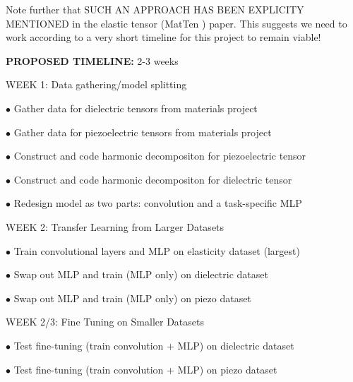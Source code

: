 \documentclass[10pt,a4paper]{article}
\begin{document}
Note further that SUCH AN APPROACH HAS BEEN EXPLICITY MENTIONED in the elastic tensor (MatTen \cite{MatTen}) paper. This suggests we need to work according to a very short timeline for this project to remain viable!

\vspace{7cm}

\noindent \textbf{PROPOSED TIMELINE:} 2-3 weeks

\medskip

WEEK 1:  Data gathering/model splitting

\medskip

$\bullet$ Gather data for dielectric tensors from materials project

\medskip

$\bullet$ Gather data for piezoelectric tensors from materials project


\medskip

$\bullet$ Construct and code harmonic decompositon for piezoelectric tensor


\medskip

$\bullet$ Construct and code harmonic decompositon for dielectric tensor

\medskip

$\bullet$ Redesign model as two parts: convolution and a task-specific MLP

\medskip

\medskip

WEEK 2: Transfer Learning from Larger Datasets

\medskip

$\bullet$ Train convolutional layers and MLP on elasticity dataset (largest)

\medskip

$\bullet$ Swap out MLP and train (MLP only) on dielectric dataset 

\medskip

$\bullet$ Swap out MLP and train (MLP only) on piezo dataset 

\medskip

\medskip

WEEK 2/3: Fine Tuning on Smaller Datasets
\medskip

$\bullet$ Test fine-tuning (train convolution + MLP) on dielectric dataset 

\medskip

$\bullet$ Test fine-tuning (train convolution + MLP) on piezo dataset 


\newpage






\end{document}

